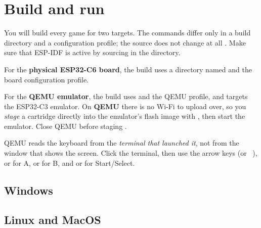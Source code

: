 \section{Build and run}

You will build every game for two targets. The commands differ only in a build
directory and a configuration profile; the source does not change at all
\citep{prg32qemu}. Make sure that ESP-IDF 
is active by sourcing  in the  directory.

For the \textbf{physical ESP32\nobreakdash-C6 board}, the build uses a directory named
 and the board configuration profile. 



For the \textbf{QEMU emulator}, the build uses  and the QEMU
profile, and targets the ESP32\nobreakdash-C3 emulator. On \textbf{QEMU} there is
no Wi-Fi to upload over, so you \emph{stage} a cartridge directly into the
emulator's flash image with , then start the
emulator. Close QEMU before staging \citep{prg32qemu}.

\begin{prgwarn}
QEMU reads the keyboard from the \emph{terminal that launched it}, not from the
window that shows the screen. Click the terminal, then use the arrow keys (or
\,\,\,),  or  for A,  or
 for B, and  or  for Start/Select.
\end{prgwarn}

\subsection{Windows}



\subsection{Linux and MacOS}

